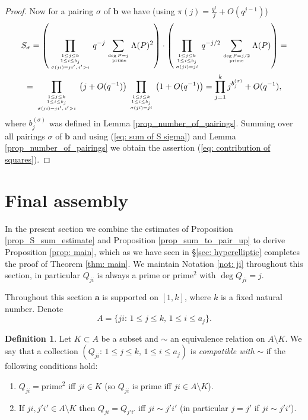 \documentclass[alphabetic, 
        colorlinks,
        linkcolor=red,  citecolor=blue,
        backref
]{amsart}
\numberwithin{equation}{section}
\theoremstyle{definition}
\newtheorem{definition}[claim]{Definition}
\begin{document}
\begin{proof}
Now for a pairing $\sigma$ of $\mathbf b$ we have (using $\pi(j)=\frac {q^j}j+O(q^{j-1})$)
\begin{multline*}
S_{\sigma}=\left(\prod_{1\le j\le k\atop{1\le i\le b_j\atop{\sigma(ji)= ji',\,i'>i}}}q^{-j}\sum_{\deg P=j\atop{\text{ prime}}}\Lambda(P)^2\right)\cdot\left(\prod_{{1\le j\le k\atop{1\le i\le b_j\atop{\sigma(ji)=ji}}}}q^{-j/2}\sum_{\deg P=j/2\atop{\text{prime}}}\Lambda(P)\right)=\\
=\prod_{1\le j\le k\atop{1\le i\le b_j\atop{\sigma(ji)= ji',\,i'>i}}}\left(j+O(q^{-1})\right)\prod_{{1\le j\le k\atop{1\le i\le b_j\atop{\sigma(ji)=ji}}}}\left(1+O(q^{-1})\right)=\prod_{j=1}^k j^{b_j^{(\sigma)}}+O(q^{-1}),
\end{multline*}
where $b_j^{(\sigma)}$ was defined in Lemma \ref{prop_number_of_pairings}. Summing over all pairings $\sigma$ of $\mathbf b$ and using (\ref{eq: sum of S sigma}) and Lemma \ref{prop_number_of_pairings} we obtain the assertion (\ref{eq: contribution of squares}).

\end{proof}

\section{Final assembly}
\label{sec: final}


In the present section we combine the estimates of Proposition \ref{prop_S_sum_estimate} and Proposition \ref{prop_sum_to_pair_up} to derive Proposition \ref{prop: main}, which as we have seen in \S\ref{sec: hyperelliptic} completes the proof of Theorem \ref{thm: main}. We maintain Notation \ref{not: ji} throughout this section, in particular $Q_{ji}$ is always a prime or prime$^2$ with $\deg Q_{ji}=j$.

Throughout this section $\mathbf a$ is supported on $[1,k]$, where $k$ is a fixed natural number.
Denote \begin{equation}\label{eq: def A}A=\{ji:\,1\le j\le k,\,1\le i\le a_j\}.\end{equation}
\begin{definition}\label{def: compatible}Let $K\subset A$ be a subset and $\sim$ an equivalence relation on $A\setminus K$. We say that a collection $(Q_{ji}:\,1\le j\le k,\,1\le i\le a_j)$ is \emph{compatible with} $\sim$ if the following conditions hold:
\begin{enumerate}\item[(i)] $Q_{ji}=\text{prime}^2$ iff $ji\in K$ (so $Q_{ji}$ is prime iff $ji\in A\setminus K$).
\item[(ii)] If $ji,j'i'\in A\setminus K$ then $Q_{ji}=Q_{j'i'}$ iff $ji\sim j'i'$ (in particular $j=j'$ if $ji\sim j'i'$).
\end{enumerate}
\end{definition}
\end{document}
